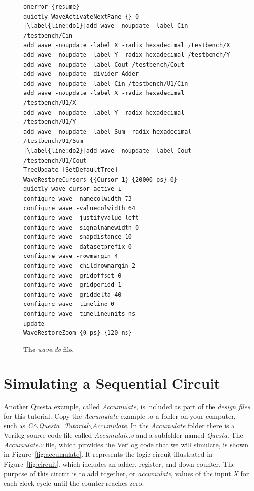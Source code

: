 \documentclass[11pt, twoside, pdftex]{article}
\begin{document}
\lstset{numbers=left,escapechar=|}
\begin{figure}[h]
\begin{center}
\begin{minipage}[t]{14.5 cm}
\begin{lstlisting}[name=do]
onerror {resume}
quietly WaveActivateNextPane {} 0
|\label{line:do1}|add wave -noupdate -label Cin /testbench/Cin
add wave -noupdate -label X -radix hexadecimal /testbench/X
add wave -noupdate -label Y -radix hexadecimal /testbench/Y
add wave -noupdate -label Cout /testbench/Cout
add wave -noupdate -divider Adder
add wave -noupdate -label Cin /testbench/U1/Cin
add wave -noupdate -label X -radix hexadecimal /testbench/U1/X
add wave -noupdate -label Y -radix hexadecimal /testbench/U1/Y
add wave -noupdate -label Sum -radix hexadecimal /testbench/U1/Sum
|\label{line:do2}|add wave -noupdate -label Cout /testbench/U1/Cout
TreeUpdate [SetDefaultTree]
WaveRestoreCursors {{Cursor 1} {20000 ps} 0}
quietly wave cursor active 1
configure wave -namecolwidth 73
configure wave -valuecolwidth 64
configure wave -justifyvalue left
configure wave -signalnamewidth 0
configure wave -snapdistance 10
configure wave -datasetprefix 0
configure wave -rowmargin 4
configure wave -childrowmargin 2
configure wave -gridoffset 0
configure wave -gridperiod 1
configure wave -griddelta 40
configure wave -timeline 0
configure wave -timelineunits ns
update
WaveRestoreZoom {0 ps} {120 ns}
\end{lstlisting}
\end{minipage}
\caption{The {\it wave.do} file.}
\label{fig:do}
\end{center}
\end{figure}

\section{Simulating a Sequential Circuit}

Another Questa example, called {\it Accumulate}, is included as part of the
{\it design files} for this tutorial. Copy the {\it Accumulate} example to 
a folder on your computer, such as 
{\it C:$\backslash$Questa\_Tutorial$\backslash$Accumulate}. In the {\it Accumulate} folder
there is a Verilog source-code file called {\it Accumulate.v} and a subfolder named 
{\it Questa}. The {\it Accumulate.v} file, which provides the Verilog code that we will 
simulate, is shown in Figure~\ref{fig:accumulate}. It
represents the logic circuit illustrated in Figure~\ref{fig:circuit}, which includes an
adder, register, and down-counter. The purpose of this circuit is to add together, or
{\it accumulate}, values of the input {\it X} for each clock cycle until the counter 
reaches zero.
\end{document}
